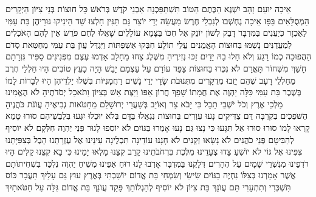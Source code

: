 \documentclass[../main/main.tex]{subfiles}
\begin{document}
\begin{multicols}{\ncols}
אֵיכָה יוּעַם זָהָב יִשְׁנֶא הַכֶּתֶם הַטּוֹב תִּשְׁתַּפֵּכְנָה אַבְנֵי קֹדֶשׁ בְּרֹאשׁ כָּל חוּצוֹת \ClosedSection{}בְּנֵי צִיּוֹן הַיְקָרִים הַמְסֻלָּאִים בַּפָּז אֵיכָה נֶחְשְׁבוּ לְנִבְלֵי חֶרֶשׂ מַעֲשֵׂה יְדֵי יוֹצֵר \ClosedSection{}גַּם תַּנִּין חָלְצוּ שַׁד הֵינִיקוּ גּוּרֵיהֶן בַּת עַמִּי לַאַכְזָר\SubEnd{} כִּיְעֵנִים\SubEnd{} בַּמִּדְבָּר \ClosedSection{}דָּבַק לְשׁוֹן יוֹנֵק אֶל חִכּוֹ בַּצָּמָא עוֹלָלִים שָׁאֲלוּ לֶחֶם פֹּרֵשׂ אֵין לָהֶם \ClosedSection{}הָאֹכְלִים לְמַעֲדַנִּים נָשַׁמּוּ בַּחוּצוֹת הָאֱמֻנִים עֲלֵי תוֹלָע חִבְּקוּ אַשְׁפַּתּוֹת \ClosedSection{}וַיִּגְדַּל עֲוֺן בַּת עַמִּי מֵחַטַּאת סְדֹם הַהֲפוּכָה כְמוֹ רָגַע וְלֹא חָלוּ בָהּ יָדָיִם \ClosedSection{}זַכּוּ נְזִירֶיהָ מִשֶּׁלֶג צַחוּ מֵחָלָב אָדְמוּ עֶצֶם מִפְּנִינִים סַפִּיר גִּזְרָתָם \ClosedSection{}חָשַׁךְ מִשְּׁחוֹר תָּאֳרָם לֹא נִכְּרוּ בַּחוּצוֹת צָפַד עוֹרָם עַל עַצְמָם יָבֵשׁ הָיָה כָעֵץ \ClosedSection{}טוֹבִים הָיוּ חַלְלֵי חֶרֶב מֵחַלְלֵי רָעָב שֶׁהֵם יָזֻבוּ מְדֻקָּרִים מִתְּנוּבֹת שָׂדָי \ClosedSection{}יְדֵי נָשִׁים רַחֲמָנִיּוֹת בִּשְּׁלוּ יַלְדֵיהֶן הָיוּ לְבָרוֹת לָמוֹ בְּשֶׁבֶר בַּת עַמִּי \ClosedSection{}כִּלָּה יַהְוֶה אֶת חֲמָתוֹ שָׁפַךְ חֲרוֹן אַפּוֹ וַיַּצֶּת אֵשׁ בְּצִיּוֹן וַתֹּאכַל יְסֹדֹתֶיהָ \ClosedSection{}לֹא הֶאֱמִינוּ מַלְכֵי אֶרֶץ וְכֹל יֹשְׁבֵי תֵבֵל כִּי יָבֹא צַר וְאוֹיֵב בְּשַׁעֲרֵי יְרוּשָׁלֵם \ClosedSection{}מֵחַטֹּאות נְבִיאֶיהָ עֲוֺנֹת כֹּהֲנֶיהָ הַשֹּׁפְכִים בְּקִרְבָּהּ דַּם צַדִּיקִים \ClosedSection{}נָעוּ עִוְרִים בַּחוּצוֹת נִגְאֲלוּ בַּדָּם בְּלֹא יוּכְלוּ יִגְּעוּ בִּלְבֻשֵׁיהֶם \ClosedSection{}סוּרוּ טָמֵא קָרְאוּ לָמוֹ סוּרוּ סוּרוּ אַל תִּגָּעוּ כִּי נָצוּ גַּם נָעוּ אָמְרוּ בַּגּוֹיִם לֹא יוֹסִפוּ לָגוּר \ClosedSection{}פְּנֵי יַהְוֶה חִלְּקָם לֹא יוֹסִיף לְהַבִּיטָם פְּנֵי כֹהֲנִים לֹא נָשָׂאוּ זְקֵנִים לֹא חָנָנוּ \ClosedSection{}עוֹדֵינָה תִּכְלֶינָה עֵינֵינוּ אֶל עֶזְרָתֵנוּ הָבֶל בְּצִפִּיָּתֵנוּ צִפִּינוּ אֶל גּוֹי לֹא יוֹשִׁעַ \ClosedSection{}צָדוּ צְעָדֵינוּ מִלֶּכֶת בִּרְחֹבֹתֵינוּ קָרַב קִצֵּנוּ מָלְאוּ יָמֵינוּ כִּי בָא קִצֵּנוּ \ClosedSection{}קַלִּים הָיוּ רֹדְפֵינוּ מִנִּשְׁרֵי שָׁמָיִם עַל הֶהָרִים דְּלָקֻנוּ בַּמִּדְבָּר אָרְבוּ לָנוּ \ClosedSection{}רוּחַ אַפֵּינוּ מְשִׁיחַ יַהְוֶה נִלְכַּד בִּשְׁחִיתוֹתָם אֲשֶׁר אָמַרְנוּ בְּצִלּוֹ נִחְיֶה בַגּוֹיִם \ClosedSection{}שִׂישִׂי וְשִׂמְחִי בַּת אֱדוֹם יוֹשַׁבְתִּי בְּאֶרֶץ עוּץ גַּם עָלַיִךְ תַּעֲבָר כּוֹס תִּשְׁכְּרִי וְתִתְעָרִי \ClosedSection{}תַּם עֲוֺנֵךְ בַּת צִיּוֹן לֹא יוֹסִיף לְהַגְלוֹתֵךְ פָּקַד עֲוֺנֵךְ בַּת אֱדוֹם גִּלָּה עַל חַטֹּאתָיִךְ\OpenSection{}\par

\end{multicols}
\end{document}
